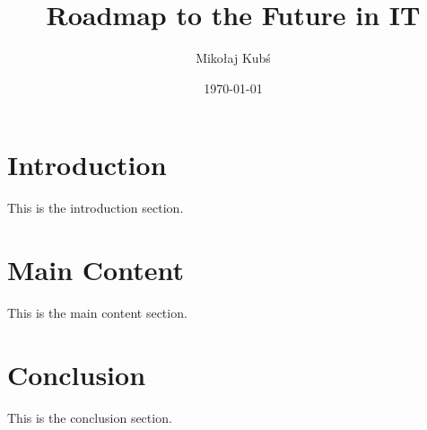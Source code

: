 \documentclass{article}
\title{Roadmap to the Future in IT}
\author{Mikołaj Kubś}
\date{\today}
\begin{document}
\maketitle

\section{Introduction}
This is the introduction section.

\section{Main Content}
This is the main content section.

\section{Conclusion}
This is the conclusion section.
\end{document}
